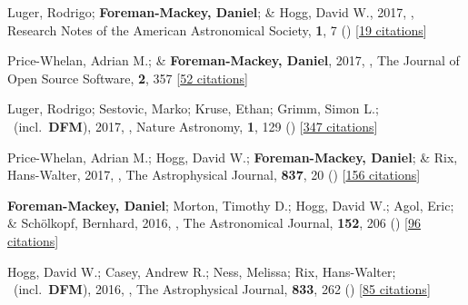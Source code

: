 \item[{\color{numcolor}\scriptsize28}] Luger, Rodrigo; \textbf{Foreman-Mackey, Daniel}; \& Hogg, David W., 2017, , Research Notes of the American Astronomical Society, \textbf{1}, 7 () [\href{https://ui.adsabs.harvard.edu/abs/2017RNAAS...1....7L}{19 citations}]

\item[{\color{numcolor}\scriptsize27}] Price-Whelan, Adrian M.; \& \textbf{Foreman-Mackey, Daniel}, 2017, , The Journal of Open Source Software, \textbf{2}, 357 [\href{https://ui.adsabs.harvard.edu/abs/2017JOSS....2..357P}{52 citations}]

\item[{\color{numcolor}\scriptsize26}] Luger, Rodrigo; Sestovic, Marko; Kruse, Ethan; Grimm, Simon L.; \etal\ (incl.\ \textbf{DFM}), 2017, , Nature Astronomy, \textbf{1}, 129 () [\href{https://ui.adsabs.harvard.edu/abs/2017NatAs...1E.129L}{347 citations}]

\item[{\color{numcolor}\scriptsize25}] Price-Whelan, Adrian M.; Hogg, David W.; \textbf{Foreman-Mackey, Daniel}; \& Rix, Hans-Walter, 2017, , The Astrophysical Journal, \textbf{837}, 20 () [\href{https://ui.adsabs.harvard.edu/abs/2017ApJ...837...20P}{156 citations}]

\item[{\color{numcolor}\scriptsize24}] \textbf{Foreman-Mackey, Daniel}; Morton, Timothy D.; Hogg, David W.; Agol, Eric; \& Sch{\"o}lkopf, Bernhard, 2016, , The Astronomical Journal, \textbf{152}, 206 () [\href{https://ui.adsabs.harvard.edu/abs/2016AJ....152..206F}{96 citations}]

\item[{\color{numcolor}\scriptsize23}] Hogg, David W.; Casey, Andrew R.; Ness, Melissa; Rix, Hans-Walter; \etal\ (incl.\ \textbf{DFM}), 2016, , The Astrophysical Journal, \textbf{833}, 262 () [\href{https://ui.adsabs.harvard.edu/abs/2016ApJ...833..262H}{85 citations}]

